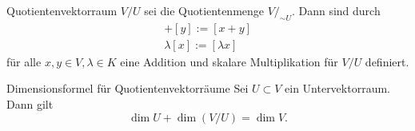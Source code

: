 \documentclass[main.tex]{subfiles}
\begin{document}
\begin{karte}{Quotientenvektorraum}
    \( V / U \) sei die Quotientenmenge \( V /_{\sim U} \). Dann sind durch 
    \begin{align*}
        [x] + [y] := [x + y]\\
        \lambda [x] := [\lambda x]
    \end{align*}
    für alle \( x,y\in V, \lambda \in K \) eine Addition und skalare Multiplikation 
    für \( V/U \) definiert.
\end{karte}
\begin{karte}{Dimensionsformel für Quotientenvektorräume}
    Sei \( U \subset V \) ein Untervektorraum. Dann gilt 
    \[ \dim U + \dim(V/U) = \dim V. \]
\end{karte}
\end{document}

